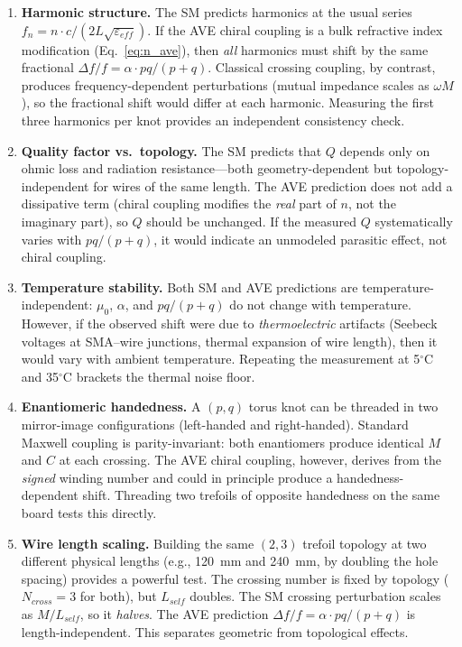 \begin{enumerate}
    \item \textbf{Harmonic structure.} The SM predicts harmonics at the usual series $f_n = n \cdot c/(2L\sqrt{\varepsilon_{eff}})$. If the AVE chiral coupling is a bulk refractive index modification (Eq.~\ref{eq:n_ave}), then \textit{all} harmonics must shift by the same fractional $\Delta f/f = \alpha \cdot pq/(p+q)$. Classical crossing coupling, by contrast, produces frequency-dependent perturbations (mutual impedance scales as $\omega M$), so the fractional shift would differ at each harmonic. Measuring the first three harmonics per knot provides an independent consistency check.

    \item \textbf{Quality factor vs.\ topology.} The SM predicts that $Q$ depends only on ohmic loss and radiation resistance---both geometry-dependent but topology-independent for wires of the same length. The AVE prediction does not add a dissipative term (chiral coupling modifies the \textit{real} part of $n$, not the imaginary part), so $Q$ should be unchanged. If the measured $Q$ systematically varies with $pq/(p+q)$, it would indicate an unmodeled parasitic effect, not chiral coupling.

    \item \textbf{Temperature stability.} Both SM and AVE predictions are temperature-independent: $\mu_0$, $\alpha$, and $pq/(p+q)$ do not change with temperature. However, if the observed shift were due to \textit{thermoelectric} artifacts (Seebeck voltages at SMA--wire junctions, thermal expansion of wire length), then it would vary with ambient temperature. Repeating the measurement at 5$^\circ$C and 35$^\circ$C brackets the thermal noise floor.

    \item \textbf{Enantiomeric handedness.} A $(p,q)$ torus knot can be threaded in two mirror-image configurations (left-handed and right-handed). Standard Maxwell coupling is parity-invariant: both enantiomers produce identical $M$ and $C$ at each crossing. The AVE chiral coupling, however, derives from the \textit{signed} winding number and could in principle produce a handedness-dependent shift. Threading two trefoils of opposite handedness on the same board tests this directly.

    \item \textbf{Wire length scaling.} Building the same $(2,3)$ trefoil topology at two different physical lengths (e.g., 120~mm and 240~mm, by doubling the hole spacing) provides a powerful test. The crossing number is fixed by topology ($N_{cross} = 3$ for both), but $L_{self}$ doubles. The SM crossing perturbation scales as $M/L_{self}$, so it \textit{halves}. The AVE prediction $\Delta f/f = \alpha \cdot pq/(p+q)$ is length-independent. This separates geometric from topological effects.


\end{enumerate}
